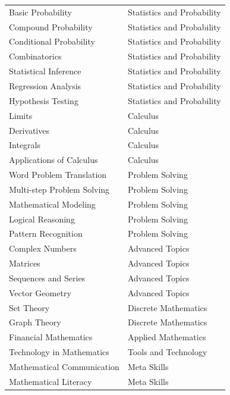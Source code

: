 \documentclass[
    a4paper, %
    10pt, %
    twoside, %
]{LTJournalArticle}
\begin{document}
\begin{supertabular}{p{0.45\columnwidth}p{0.45\columnwidth}}
Basic Probability & Statistics and Probability \\
Compound Probability & Statistics and Probability \\
Conditional Probability & Statistics and Probability \\
Combinatorics & Statistics and Probability \\
Statistical Inference & Statistics and Probability \\
Regression Analysis & Statistics and Probability \\
Hypothesis Testing & Statistics and Probability \\
Limits & Calculus \\
Derivatives & Calculus \\
Integrals & Calculus \\
Applications of Calculus & Calculus \\
Word Problem Translation & Problem Solving \\
Multi-step Problem Solving & Problem Solving \\
Mathematical Modeling & Problem Solving \\
Logical Reasoning & Problem Solving \\
Pattern Recognition & Problem Solving \\
Complex Numbers & Advanced Topics \\
Matrices & Advanced Topics \\
Sequences and Series & Advanced Topics \\
Vector Geometry & Advanced Topics \\
Set Theory & Discrete Mathematics \\
Graph Theory & Discrete Mathematics \\
Financial Mathematics & Applied Mathematics \\
Technology in Mathematics & Tools and Technology \\
Mathematical Communication & Meta Skills \\
Mathematical Literacy & Meta Skills \\
\end{supertabular}
\normalsize
\end{document}
